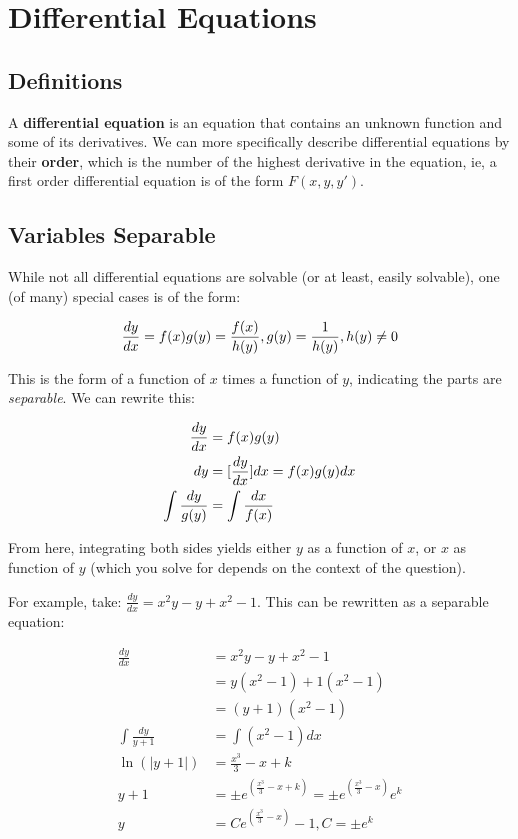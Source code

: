 \documentclass[12pt]{article}
\begin{document}
\newpage
\section{Differential Equations}
\subsection{Definitions}

A \textbf{differential equation} is an equation that contains an unknown function and some of its derivatives. We can more specifically describe differential equations by their \textbf{order}, which is the number of the highest derivative in the equation, ie, a first order differential equation is of the form $F(x,y,y')$.

\subsection{Variables Separable}\label{sec:separable}

While not all differential equations are solvable (or at least, easily solvable), one (of many) special cases is of the form:

\[
\frac{dy}{dx} = f(x)g(y) = \frac{f(x)}{h(y)}, g(y) = \frac{1}{h(y)}, h(y) \neq 0
\]

This is the form of a function of $x$ times a function of $y$, indicating the parts are \textit{separable}. We can rewrite this:

\begin{equation}
    \begin{split}
        \frac{dy}{dx} &= f(x)g(y)\\
        dy &= [\frac{dy}{dx}]dx = f(x)g(y)dx\\
        \int \frac{dy}{g(y)} &= \int \frac{dx}{f(x)}
    \end{split}
\end{equation}

From here, integrating both sides yields either $y$ as a function of $x$, or $x$ as function of $y$ (which you solve for depends on the context of the question).

For example, take: $\frac{dy}{dx} = x^2 y - y + x^2 -1$. This can be rewritten as a separable equation:

\begin{equation}
    \begin{split}
        \frac{dy}{dx} &= x^2y-y+x^2-1\\
        &= y(x^2-1)+1(x^2-1)\\
        &= (y+1)(x^2-1)\\
        \int \frac{dy}{y+1} &= \int (x^2-1)dx\\
        \ln(|y+1|) &= \frac{x^3}{3} - x + k\\
        y + 1 &= \pm e^{(\frac{x^3}{3}-x+k)} = \pm e^{(\frac{x^3}{3}-x)}e^k\\
        y &= Ce^{(\frac{x^3}{3}-x)}-1, C = \pm e^k
    \end{split}
\end{equation}
\end{document}
